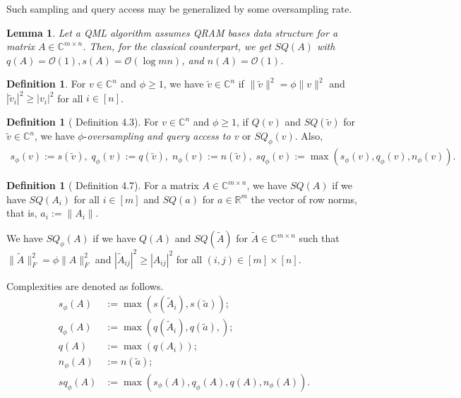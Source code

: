 \documentclass[10pt,twoside,reqno]{amsart} %
\theoremstyle{plain}
\newtheorem{lem}[thm]{Lemma}
\theoremstyle{definition}
\newtheorem{defn}[thm]{Definition}
\begin{document}
Such sampling and query access may be generalized by some oversampling rate.

\begin{lem}
  Let a QML algorithm assumes QRAM bases data structure for a matrix
  $A\in\mathbb{C}^{m\times n}$. Then, for the classical counterpart, we 
  get $SQ(A)$ with $q(A)=\mathcal{O}(1), s(A)=\mathcal{O}(\log mn)$, and
  $n(A)=\mathcal{O}(1)$. 
\end{lem}

\begin{defn}
  For $v\in\mathbb{C}^n$ and $\phi\geq1$, we have
  $\widetilde{v}\in\mathbb{C}^n$ if $\|\widetilde{v}\|^2=\phi\|v\|^2$ and
  $|\widetilde{v}_i|^2\geq |v_i|^2$ for all $i\in[n]$.
\end{defn}

\begin{defn}[\cite{tang2023} Definition 4.3]
  For $v\in\mathbb{C}^n$ and $\phi\geq1$, if $Q(v)$ and 
  $SQ(\widetilde{v})$ for $\widetilde{v}\in\mathbb{C}^n$, we have 
  $\phi$-\emph{oversampling and query access to $v$} or $SQ_{\phi}(v)$. Also,
  \begin{align*}
    s_{\phi}(v) := s(\widetilde{v}),\;
    q_{\phi}(v) := q(\widetilde{v}),\;
    n_{\phi}(v) := n(\widetilde{v}),\;
    sq_{\phi}(v) := \max(s_{\phi}(v),q_{\phi}(v),n_{\phi}(v)).
  \end{align*}
\end{defn}

\begin{defn}[\cite{tang2023} Definition 4.7]
  For a matrix $A\in\mathbb{C}^{m\times n}$, we have $SQ(A)$ if we have
  $SQ(A_i)$ for all $i\in[m]$ and $SQ(a)$ for $a\in\mathbb{R}^m$ the vector
  of row norms, that is, $a_i:=\|A_i\|$.

  We have $SQ_{\phi}(A)$ if we have $Q(A)$ and $SQ(\widetilde{A})$ for
  $\widetilde{A}\in\mathbb{C}^{m\times n}$ such that $\|\widetilde{A}\|^2_F=
  \phi\|A\|^2_F$ and $|\widetilde{A}_{ij}|^2\geq|A_{ij}|^2$ for all 
  $(i,j)\in[m]\times[n]$.

  Complexities are denoted as follows.
  \begin{align*}
    s_{\phi}(A) &:= \max(s(\widetilde{A}_i),s(\widetilde{a}));\\
    q_{\phi}(A) &:= \max(q(\widetilde{A}_i),q(\widetilde{a}),);\\
    q(A)&:=\max(q(A_i));\\
    n_{\phi}(A)&:=n(\widetilde{a});\\
    sq_{\phi}(A)&:=\max(s_{\phi}(A),q_{\phi}(A),q(A),n_{\phi}(A)).
  \end{align*}
\end{defn}
\end{document}

